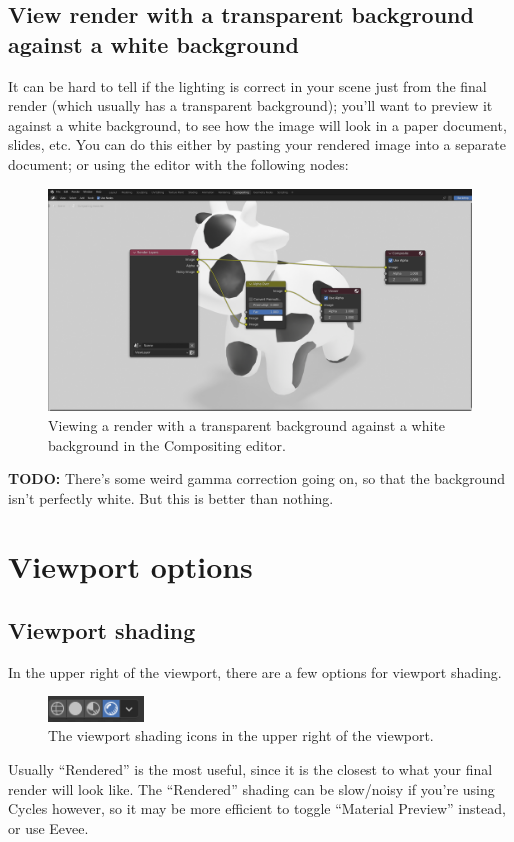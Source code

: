 \documentclass[10pt]{article}
\begin{document}
\subsection{View render with a transparent background against a white background}
\label{sec:preview_with_white_background}
It can be hard to tell if the lighting is correct in your scene just from the final render (which usually has a transparent background); you'll want to preview it against a white background, to see how the image will look in a paper document, slides, etc. You can do this either by pasting your rendered image into a separate document; or using the  editor with the following nodes:
\begin{figure}[H]
    \centering
    \captionsetup{width=0.8\textwidth}
    \includegraphics[width=6in]{images/2022-09-07_preview-in-compositor.png}
    \caption{Viewing a render with a transparent background against a white background in the Compositing editor.}
\end{figure}
{\bf TODO:} There's some weird gamma correction going on, so that the background isn't perfectly white. But this is better than nothing.

\section{Viewport options}

\subsection{Viewport shading}
\label{sec:viewport_shading}

In the upper right of the viewport, there are a few options for viewport shading. 
\begin{figure}[H]
    \centering
    \captionsetup{width=0.8\textwidth}
    \includegraphics[width=1in]{images/2022-09-07_viewport-shading-options.png}
    \caption{The viewport shading icons in the upper right of the viewport.}
\end{figure}
Usually ``Rendered'' is the most useful, since it is the closest to what your final render will look like. The ``Rendered'' shading can be slow/noisy if you're using Cycles however, so it may be more efficient to toggle ``Material Preview'' instead, or use Eevee.
\end{document}
